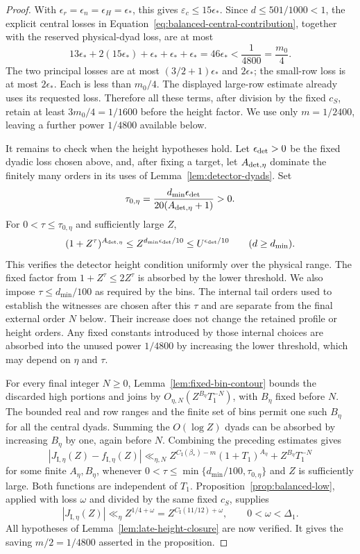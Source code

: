 \documentclass[11pt,a4paper]{article}
\numberwithin{equation}{section}
\numberwithin{figure}{section}
\theoremstyle{definition}
\theoremstyle{remark}
\begin{document}
\begin{proof}
With $\epsilon_r=\epsilon_n=\epsilon_H=\epsilon_*$, this gives
$\varepsilon_c\le15\epsilon_*$.  Since $d\le501/1000<1$, the explicit
central losses in Equation~\eqref{eq:balanced-central-contribution}, together
with the reserved physical-dyad loss, are at most
\[
 13\epsilon_*+2(15\epsilon_*)+\epsilon_*+\epsilon_*+\epsilon_*
 =46\epsilon_*<\frac1{4800}=\frac{m_0}{4}.
\]
The two principal losses are at most $(3/2+1)\epsilon_*$ and
$2\epsilon_*$; the small-row loss is at most $2\epsilon_*$.  Each is less
than $m_0/4$.  The displayed large-row estimate already uses its requested
loss.  Therefore all these terms, after division by the fixed $c_S$, retain
at least $3m_0/4=1/1600$ before the height factor.  We use only
$m=1/2400$, leaving a further power $1/4800$ available below.

It remains to check when the height hypotheses hold.  Let
$\epsilon_{\rm det}>0$ be the fixed dyadic loss chosen above, and, after
fixing a target, let $A_{{\rm det},\eta}$ dominate the finitely many orders
in its uses of Lemma~\ref{lem:detector-dyads}.  Set
\[
 \tau_{0,\eta}
 =\frac{d_{\min}\epsilon_{\rm det}}
        {20(A_{{\rm det},\eta}+1)}>0.
\]
For $0<\tau\le\tau_{0,\eta}$ and sufficiently large $Z$,
\[
 (1+Z^\tau)^{A_{{\rm det},\eta}}
 \le Z^{d_{\min}\epsilon_{\rm det}/10}
 \le U^{\epsilon_{\rm det}/10}
 \qquad(d\ge d_{\min}).
\]
This verifies the detector height condition uniformly over the physical
range.  The fixed factor from $1+Z^\tau\le2Z^\tau$ is absorbed by the lower
threshold.  We also impose $\tau\le d_{\min}/100$ as required by the bins.
The internal tail orders used to establish the witnesses are chosen after
this $\tau$ and are separate from the final external order $N$ below.
Their increase does not change the retained profile or height orders.
Any fixed constants introduced by those internal choices are absorbed into
the unused power $1/4800$ by increasing the lower threshold, which may depend
on $\eta$ and $\tau$.

For every final integer $N\ge0$, Lemma~\ref{lem:fixed-bin-contour}
bounds the discarded high portions and joins by
$O_{\eta,N}(Z^{B_\eta}T_1^{-N})$, with $B_\eta$ fixed before $N$.
The bounded real and row ranges and the finite set of bins permit one such
$B_\eta$ for all the central dyads.
Summing the $O(\log Z)$ dyads can be absorbed by increasing $B_\eta$ by one,
again before $N$.  Combining the preceding estimates gives
\[
 |J_{\mathrm I,\eta}(Z)-f_{\mathrm I,\eta}(Z)|
 \ll_{\eta,N}Z^{C_{\mathrm I}(\beta_*)-m}(1+T_1)^{A_\eta}
       +Z^{B_\eta}T_1^{-N}
\]
for some finite $A_\eta,B_\eta$, whenever
$0<\tau\le\min\{d_{\min}/100,\tau_{0,\eta}\}$ and $Z$ is sufficiently
large.  Both functions are independent of $T_1$.
Proposition~\ref{prop:balanced-low}, applied with loss $\omega$ and divided
by the same fixed $c_S$, supplies
\[
 |J_{\mathrm I,\eta}(Z)|\ll_\eta
 Z^{1/4+\omega}=Z^{C_{\mathrm I}(11/12)+\omega},
 \qquad 0<\omega<\Delta_1.
\]
All hypotheses of Lemma~\ref{lem:late-height-closure} are now verified.
It gives the saving $m/2=1/4800$ asserted in the proposition.
\end{proof}
\end{document}
